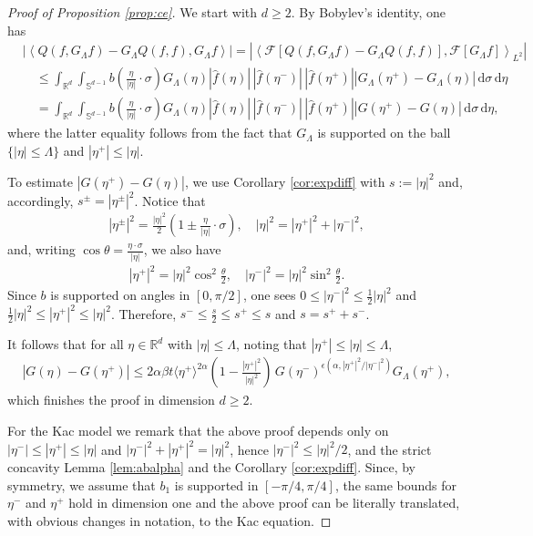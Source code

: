\documentclass[11pt,a4paper,reqno]{amsart}
\theoremstyle{plain}
\theoremstyle{definition}
\begin{document}
\begin{proof}[Proof of Proposition \ref{prop:ce}]
	We start with $d\geq 2$. By Bobylev's identity, one has
	\begin{align*}
		&\left| \left\langle Q(f, G_{\Lambda}f) - G_{\Lambda} Q(f,f), G_{\Lambda}f\right\rangle\right| = \left| \left\langle \mathcal{F}\left[Q(f, G_{\Lambda}f) -G_{\Lambda} Q(f,f)\right], \mathcal{F}\left[G_{\Lambda}f\right]\right\rangle_{L^2}\right| \\
		&\quad \leq \int_{{\mathbb{R}}^d} \int_{{\mathbb{S}}^{d-1}} b\left(\frac{\eta}{|\eta|}\cdot\sigma\right) G_{\Lambda}(\eta) |\hat{f}(\eta)| \, |\hat{f}(\eta^-)| \, |\hat{f}(\eta^+)| |G_{\Lambda}(\eta^+) - G_{\Lambda}(\eta)| \,\mathrm{d}\sigma \,\mathrm{d}\eta\\
		&\quad = \int_{{\mathbb{R}}^d} \int_{{\mathbb{S}}^{d-1}} b\left(\frac{\eta}{|\eta|}\cdot\sigma\right) G_{\Lambda}(\eta) |\hat{f}(\eta)| \, |\hat{f}(\eta^-)| \, |\hat{f}(\eta^+)| |G(\eta^+) - G(\eta)| \,\mathrm{d}\sigma \,\mathrm{d}\eta,
	\end{align*}
where the latter equality follows from the fact that $G_{\Lambda}$ is supported on the ball $\{|\eta|\leq \Lambda\}$ and $|\eta^+| \leq |\eta|$.

To estimate $|G(\eta^+) - G(\eta)|$, we use Corollary \ref{cor:expdiff} with $s:=|\eta|^2$ and, accordingly, $s^{\pm} = |\eta^{\pm}|^2$. Notice that
\begin{align*}
	|\eta^{\pm}|^2 = \frac{|\eta|^2}{2} \left( 1 \pm \frac{\eta}{|\eta|}\cdot \sigma \right), \quad |\eta|^2 = |\eta^+|^2 + |\eta^-|^2,
\end{align*}
and, writing $\cos\theta = \frac{\eta\cdot \sigma}{|\eta|}$, we also have
\begin{align*}
	|\eta^+|^2 = |\eta|^2 \cos^2\tfrac{\theta}{2}, \quad 	|\eta^-|^2 = |\eta|^2 \sin^2\tfrac{\theta}{2}.
\end{align*}
Since $b$ is supported on angles in $[0, \pi/2]$, one sees $0\leq |\eta^-|^2 \leq \frac{1}{2} |\eta|^2$ and $\frac{1}{2}|\eta|^2 \leq |\eta^+|^2 \leq |\eta|^2$.
Therefore, $s^-\leq \frac{s}{2} \leq s^+ \leq s$ and $s = s^+ + s^-$.

It follows that for all $\eta\in{\mathbb{R}}^d$ with $|\eta|\leq\Lambda$, noting that $|\eta^+|\leq |\eta|\leq \Lambda$,
\begin{align}
		|G(\eta) - G(\eta^+)| \leq 2\alpha\beta t \langle \eta^+ \rangle^{2\alpha}\left(1-\tfrac{|\eta^+|^2}{|\eta|^2}\right) \,  G(\eta^-)^{\epsilon(\alpha,|\eta^+|^2/|\eta^-|^2 )} G_{\Lambda}(\eta^+),
\end{align}
which finishes the proof in dimension $d\ge 2$.

For the Kac model we remark that the above proof depends only on $|\eta^-|\le |\eta^+|\leq |\eta|$ and $|\eta^-|^2+ |\eta^+|^2= |\eta|^2$, hence $|\eta^-|^2\le |\eta|^2/2$, and the strict concavity Lemma \ref{lem:abalpha} and the Corollary \ref{cor:expdiff}.
Since, by symmetry, we assume that $b_1$ is supported in $[-\pi/4, \pi/4]$, the same bounds for $\eta^-$ and $\eta^+$ hold in dimension one and the above proof can be literally translated, with obvious changes in notation, to the Kac equation.
\end{proof}
\end{document}
